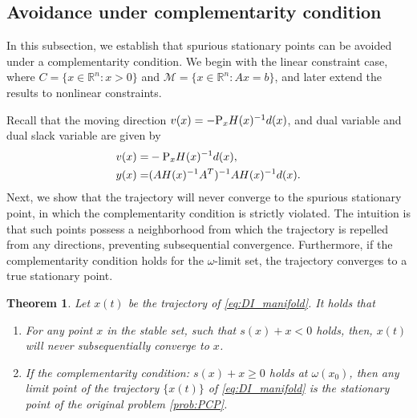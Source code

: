 \documentclass[11pt]{article}
\newtheorem{theorem}{Theorem}[section]
\begin{document}
\subsection{Avoidance under complementarity condition}
In this subsection, we establish that spurious stationary points can be avoided under a complementarity condition. We begin with the linear constraint case, where $C = \{x \in \mathbb{R}^n : x > 0\}$ and $\mathcal{M} = \{x \in \mathbb{R}^n : Ax = b\}$, and later extend the results to nonlinear constraints.

Recall that the moving direction $v(x)=-{\rm P}_xH(x)^{-1}d(x)$, and dual variable and dual slack variable are given by
\[
\begin{aligned}
   v(x)=&-{\rm P}_xH(x)^{-1}d(x), \\
   y(x)=&(AH(x)^{-1}A^T)^{-1}AH(x)^{-1}d(x).
\end{aligned}
\]
Next, we show that the trajectory will never converge to the spurious stationary point, in which the complementarity condition is strictly violated. The intuition is that such points possess a neighborhood from which the trajectory is repelled from any directions, preventing subsequential convergence. Furthermore, if the complementarity condition holds for the $\omega$-limit set, the trajectory converges to a true stationary point.

\begin{theorem}
\label{thm:completmentarity}
Let $x(t)$ be the trajectory of \eqref{eq:DI_manifold}. It holds that
\begin{enumerate}
    \item[(i)] For any point $x$ in the stable set, such that $s(x)+x<0$ holds, then, $x(t)$ will never subsequentially converge to $x$.
    \item[(ii)] If the complementarity condition: $s(x)+x\geq0$ holds at $\omega(x_0)$, then any limit point of the trajectory $\{x(t)\}$ of \eqref{eq:DI_manifold} is the stationary point of the original problem \eqref{prob:PCP}.
\end{enumerate}
\end{theorem}
\end{document}
